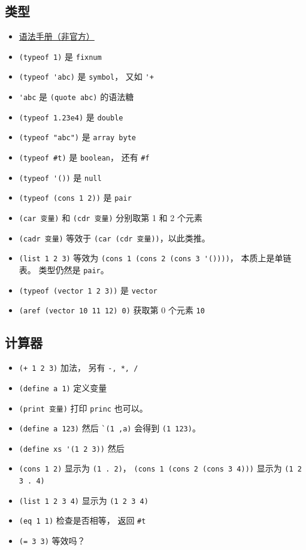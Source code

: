 
\subsection{类型}
\begin{itemize}
\item \href{https://code.google.com/archive/p/femtolisp/wikis/Manual.wiki}{语法手册（非官方）}
\item \verb`(typeof 1)` 是 \verb`fixnum`
\item \verb`(typeof 'abc)` 是 \verb`symbol`， 又如 \verb`'+`
\item \verb`'abc` 是 \verb`(quote abc)` 的语法糖
\item \verb`(typeof 1.23e4)` 是 \verb`double`
\item \verb`(typeof "abc")` 是 \verb`array byte`
\item \verb`(typeof #t)` 是 \verb`boolean`， 还有 \verb`#f`
\item \verb`(typeof '())` 是 \verb`null`
\item \verb`(typeof (cons 1 2))` 是 \verb`pair`
\item \verb`(car 变量)` 和 \verb`(cdr 变量)` 分别取第 1 和 2 个元素
\item \verb`(cadr 变量)` 等效于 \verb`(car (cdr 变量))`，以此类推。
\item \verb`(list 1 2 3)` 等效为 \verb`(cons 1 (cons 2 (cons 3 '())))`， 本质上是单链表。 类型仍然是 \verb`pair`。
\item \verb`(typeof (vector 1 2 3))` 是 \verb`vector`
\item \verb`(aref (vector 10 11 12) 0)` 获取第 0 个元素 \verb`10`

\end{itemize}

\subsection{计算器}
\begin{itemize}
\item \verb`(+ 1 2 3)` 加法， 另有 \verb`-, *, /`
\item \verb`(define a 1)` 定义变量
\item \verb`(print 变量)` 打印 \verb`princ` 也可以。
\item \verb`(define a 123)` 然后 \verb|`(1 ,a)| 会得到 \verb`(1 123)`。
\item \verb`(define xs '(1 2 3))` 然后 \verb``
\item \verb`(cons 1 2)` 显示为 \verb`(1 . 2)`， \verb`(cons 1 (cons 2 (cons 3 4)))` 显示为 \verb`(1 2 3 . 4)`
\item \verb`(list 1 2 3 4)` 显示为 \verb`(1 2 3 4)`
\item \verb`(eq 1 1)` 检查是否相等， 返回 \verb`#t`
\item \verb`(= 3 3)` 等效吗？
\end{itemize}

